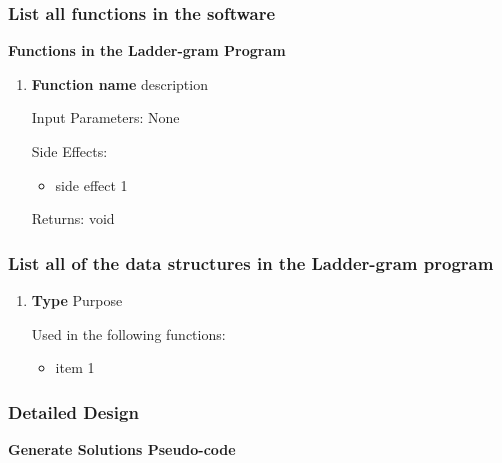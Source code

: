 \documentclass[12pt, a4]{report}
\begin{document}
	\subsubsection{List all functions in the software}
	\textbf{	Functions in the Ladder-gram Program}
	\begin{enumerate}
		\item
			\textbf{Function name}
			\textbar{}  description
			\par Input Parameters: None
			\par Side Effects:
			\begin{itemize}
				\item side effect 1
			\end{itemize}
			\par Returns: void
	\end{enumerate}
	

	
	\subsubsection{List all of the data structures in the Ladder-gram program}
		\begin{enumerate}
				\item
					\textbf{Type}
					\textbar{} Purpose
					\par Used in the following functions:
					\begin{itemize}
						\item item 1
					\end{itemize}
		\end{enumerate}
	

	\subsubsection{Detailed Design}
	
	
	\textbf{Generate Solutions Pseudo-code}
	

\end{document}
